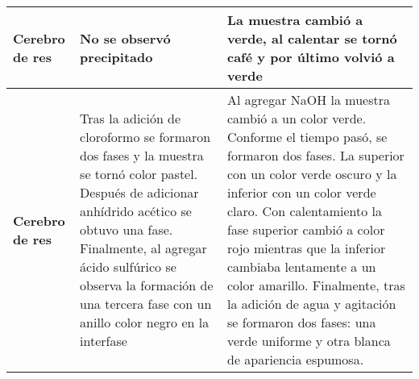 \begin{table*}[h!]
\begin{tabular}{p{2.5cm}|p{7cm}p{7cm}}
		\textbf{Cerebro de res} & No se observó precipitado & La muestra cambió a verde, al calentar se tornó café y por último volvió a verde
		\\
		\hline
		\textbf{Cerebro de res} & Tras la adición de cloroformo se formaron dos fases y la muestra se tornó color pastel. Después de adicionar anhídrido acético se obtuvo una fase. Finalmente, al agregar ácido sulfúrico se observa la formación de una tercera fase con un anillo color negro en la interfase & Al agregar NaOH la muestra cambió a un color verde. Conforme el tiempo pasó, se formaron dos fases. La superior con un color verde oscuro y la inferior con un color verde claro. Con calentamiento la fase superior cambió a color rojo mientras que la inferior cambiaba lentamente a un color amarillo. Finalmente, tras la adición de agua y agitación se formaron dos fases: una verde uniforme y otra blanca de apariencia espumosa.
		\\
		\hline
	\end{tabular}
\end{table*}
